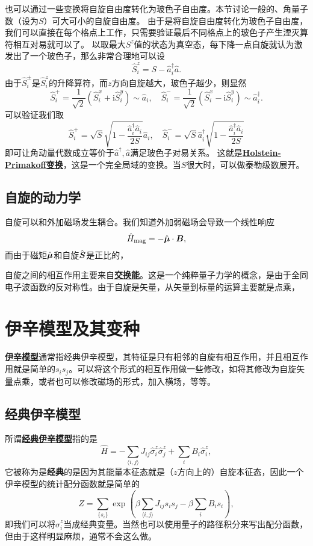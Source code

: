 \documentclass[hyperref, UTF8, a4paper]{ctexart}
\newcommand*{\ii}{\mathrm{i}}
\newcommand*{\pair}[1]{\langle #1 \rangle}
\renewcommand{\emph}[1]{\textbf{#1}}
\newcommand*{\concept}[1]{\underline{\textbf{#1}}}
\begin{document}
也可以通过一些变换将自旋自由度转化为玻色子自由度。本节讨论一般的、角量子数（设为$S$）可大可小的自旋自由度。
由于是将自旋自由度转化为玻色子自由度，我们可以直接在每个格点上工作，只需要验证最后不同格点上的玻色子产生湮灭算符相互对易就可以了。
以取最大$S^z$值的状态为真空态，每下降一点自旋就认为激发出了一个玻色子，那么非常合理地可以设
\[
    \hat{S}_i^z = S - \hat{a}^\dagger_i \hat{a}.
\]
由于$\hat{S}_i^\pm$是$\hat{S}^z_i$的升降算符，而$z$方向自旋越大，玻色子越少，则显然
\[
    \hat{S}_i^+ = \frac{1}{\sqrt{2}} (\hat{S}^x_i + \ii \hat{S}^y_i) \sim \hat{a}_i, \quad \hat{S}_i^- = \frac{1}{\sqrt{2}} (\hat{S}^x_i - \ii \hat{S}^y_i) \sim \hat{a}_i^\dagger.
\]
可以验证我们取
\begin{equation}
    \hat{S}^+_i = \sqrt{S} \sqrt{1 - \frac{\hat{a}_i^\dagger \hat{a}_i}{2S}} \hat{a}_i, \quad \hat{S}^-_i = \sqrt{S} \hat{a}_i^\dagger \sqrt{1 - \frac{\hat{a}_i^\dagger \hat{a}_i}{2S}}
\end{equation}
即可让角动量代数成立等价于$\hat{a}^\dagger, \hat{a}$满足玻色子对易关系。
这就是\concept{Holstein-Primakoff变换}，这是一个完全局域的变换。当$S$很大时，可以做泰勒级数展开。

\subsection{自旋的动力学}

自旋可以和外加磁场发生耦合。我们知道外加弱磁场会导致一个线性响应
\[
    \hat{H}_\text{mag} = - \hat{\vb*{\mu}} \cdot \vb*{B},
\]
而由于磁矩$\hat{\vb*{\mu}}$和自旋$\hat{\vb*{S}}$是正比的，

自旋之间的相互作用主要来自\concept{交换能}。这是一个纯粹量子力学的概念，是由于全同电子波函数的反对称性。由于自旋是矢量，从矢量到标量的运算主要就是点乘，

\section{伊辛模型及其变种}

\concept{伊辛模型}通常指经典伊辛模型，其特征是只有相邻的自旋有相互作用，并且相互作用就是简单的$s_i s_j$。可以将这个形式的相互作用做一些修改，如将其修改为自旋矢量点乘，或者也可以修改磁场的形式，加入横场，等等。

\subsection{经典伊辛模型}

所谓\concept{经典伊辛模型}指的是
\begin{equation}
    \hat{H} = - \sum_{\pair{i, j}} J_{ij} \hat{\sigma}_i^z \hat{\sigma}_j^z + \sum_{i} B_i \hat{\sigma}_i^z,
\end{equation}
它被称为是\emph{经典}的是因为其能量本征态就是（$z$方向上的）自旋本征态，因此一个伊辛模型的统计配分函数就是简单的
\begin{equation}
    Z = \sum_{\{s_i\}} \exp(\beta \sum_{\pair{i, j}} J_{ij} s_i s_j - \beta \sum_i B_i s_i),
\end{equation}
即我们可以将$\hat{\sigma}_i^z$当成经典变量。当然也可以使用量子的路径积分来写出配分函数，但由于这样明显麻烦，通常不会这么做。
\end{document}
